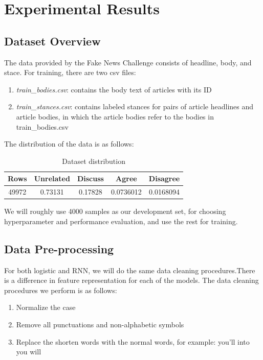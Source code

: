 \documentclass[11.5pt]{article}
\begin{document}
\section{Experimental Results}

\subsection{Dataset Overview}

The data provided by the Fake News Challenge consists of 
headline, body, and stace. 
For training, there are two csv files:
\begin{enumerate}
  \item \textit{train\_bodies.csv}: contains the body text of articles with its ID
  \item \textit{train\_stances.csv}: contains labeled stances for pairs of article 
      headlines and article bodies, in which the article bodies refer to the 
      bodies in train\_bodies.csv
\end{enumerate}

The distribution of the data is as follows:
\begin{table}[h]
  \centering
  \begin{tabular} 
    {|c|c|c|c|c|}
    \hline
    Rows & Unrelated & Discuss & Agree & Disagree \\
    \hline
    49972 & 0.73131 & 0.17828 & 0.0736012 & 0.0168094 \\
    \hline
  \end{tabular}
  \caption{Dataset distribution}
\end{table}

We will roughly use 4000 samples as our development set, for choosing 
hyperparameter and performance evaluation, and use the rest for training. 

\subsection{Data Pre-processing}

For both logistic and RNN, we will do the same data cleaning procedures.There is a difference in feature representation for each of the models.
The data cleaning procedures we perform is as follows:

\begin{enumerate}
  \item Normalize the case
  \item Remove all punctuations and non-alphabetic symbols 
  \item Replace the shorten words with the normal words, for example: you'll into you will
\end{enumerate}
\end{document}
